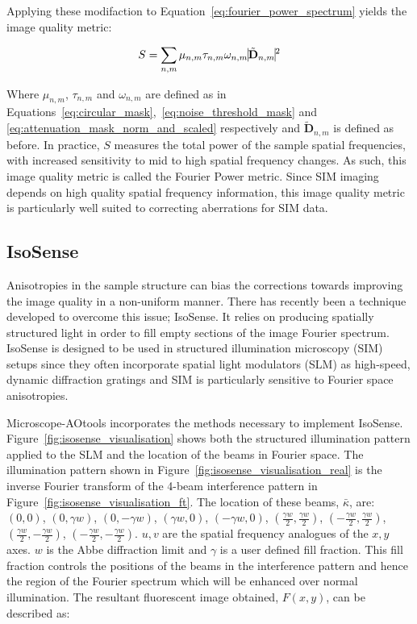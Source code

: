 	Applying these modifaction to Equation~\ref{eq:fourier_power_spectrum} 
	yields the image quality metric:
	
	\begin{equation}\label{eq:Fourier_power_metric}
	S = \sum\limits_{n,m}{\mu_{n,m}\tau_{n,m}\omega_{n,m}\vline \tilde{\textbf{D}}_{n,m} \vline^2}
	\end{equation}
	
	Where $\mu_{n,m}$, $\tau_{n,m}$ and $\omega_{n,m}$ are defined as in
	Equations~\ref{eq:circular_mask},~\ref{eq:noise_threshold_mask} and
	\ref{eq:attenuation_mask_norm_and_scaled} respectively and 
	$\tilde{\textbf{D}}_{n,m}$ is defined as before. In practice, $S$
	measures the total power of the sample spatial frequencies, with 
	increased sensitivity to mid to high spatial frequency changes. As
	such, this image quality metric is called the Fourier Power metric.
	Since SIM imaging depends on high quality spatial frequency 
	information, this image quality metric is particularly well suited 
	to correcting aberrations for SIM data.
	
	\subsection{IsoSense}
	\label{subsec:isosense}
	
	Anisotropies in the sample structure can bias the corrections
	towards improving the image quality in a non-uniform manner.
	There has recently been a technique developed to overcome 
	this issue; IsoSense\cite{vzurauskas2019isosense}. It relies 
	on producing spatially structured light in order to fill 
	empty sections of the image Fourier spectrum. IsoSense is 
	designed to be used in structured illumination microscopy 
	(SIM) setups since they often incorporate spatial light 
	modulators (SLM) as high-speed, dynamic diffraction 
	gratings and SIM is particularly sensitive to Fourier
	space anisotropies.
	
	Microscope-AOtools incorporates the methods necessary to implement
	IsoSense. Figure~\ref{fig:isosense_visualisation} shows both
	the structured illumination pattern applied to the SLM 
	and the location of the beams in Fourier space. The illumination
	pattern shown in Figure~\ref{fig:isosense_visualisation_real} is
	the inverse Fourier transform of the 4-beam interference pattern 
	in Figure~\ref{fig:isosense_visualisation_ft}. The location 
	of these beams, $\bar{\kappa}$, are: 
	$(0,0)$, $(0,\gamma w)$, $(0,-\gamma w)$, $(\gamma w, 0)$, 
	$(-\gamma w, 0)$, $(\frac{\gamma w}{2}, \frac{\gamma w}{2})$, 
	$(-\frac{\gamma w}{2}, \frac{\gamma w}{2})$, $(\frac{\gamma w}{2},
	 -\frac{\gamma w}{2})$, $(-\frac{\gamma w}{2}, 
	 -\frac{\gamma w}{2})$. $u,v$ are the spatial frequency 
	analogues of the $x,y$ axes. $w$ is the Abbe diffraction limit and 
	$\gamma$ is a user defined fill fraction. This fill
	fraction controls the positions of the beams in the interference
	pattern and hence the region of the Fourier spectrum which will 
	be enhanced over normal illumination. The resultant fluorescent image 
	obtained, $F(x,y)$, can be described as:
	
